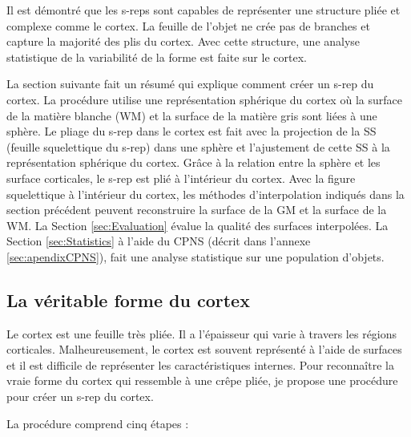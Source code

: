 Il est démontré que les s-reps sont capables de représenter une structure pliée et complexe comme le cortex.
La feuille de l'objet ne crée pas de branches et capture la majorité des plis du cortex.
Avec cette structure, une analyse statistique de la variabilité de la forme est faite sur le cortex.

La section suivante fait un résumé qui explique comment créer un s-rep du cortex.
La procédure utilise une représentation sphérique du cortex \cite{fischl_cortical_1999 cortex}
où la surface de la matière blanche (WM) et la surface de la matière gris sont liées à une sphère.
Le pliage du s-rep dans le cortex est fait
avec la projection de la SS (feuille squelettique du s-rep) dans une sphère
et l'ajustement de cette SS à la représentation sphérique du cortex.
Grâce à la relation entre la sphère et les surface corticales, le s-rep est plié à l'intérieur du cortex.
Avec la figure squelettique à l'intérieur du cortex,
les méthodes d'interpolation indiqués dans la section 
précédent peuvent reconstruire la surface de la GM et la surface de la WM.
La Section \ref{sec:Evaluation} évalue la qualité des surfaces interpolées.
La Section \ref{sec:Statistics} à l'aide du CPNS (décrit dans l'annexe \ref{sec:apendixCPNS}),
fait une analyse statistique sur une population d'objets. 

\subsection{La véritable forme du cortex}

Le cortex est une feuille très pliée. Il a l'épaisseur qui varie à travers les régions corticales.
Malheureusement, le cortex est souvent représenté à l'aide de surfaces et il est difficile 
de représenter les caractéristiques internes.
Pour reconnaître la vraie forme du cortex qui ressemble à une crêpe pliée,
je propose une procédure pour créer un s-rep du cortex.

La procédure comprend cinq étapes :

